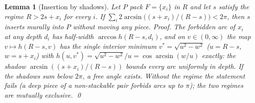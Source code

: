 \documentclass[11pt]{article}
\newtheorem{lemma}[theorem]{Lemma}
\theoremstyle{definition}
\begin{document}
\begin{lemma}[Insertion by shadows]\label{lem:insert}
Let $P$ pack $F=\{x_i\}$ in $R$ and let $s$ satisfy the regime
$R>2s+x_i$ for every $i$. If
$\sum_i2\arcsin\bigl((s+x_i)/(R-s)\bigr)<2\pi$, then $s$ inserts
murally into $P$ without moving any piece. \emph{Proof.} The
forbidden arc of $x_i$ at any depth $d_i$ has half-width
$\arccos h(R-s,d_i)$, and on $v\in(0,\infty)$ the map
$v\mapsto h(R-s,v)$ has the single interior minimum
$v^*=\sqrt{u^2-w^2}$ ($u=R-s$, $w=s+x_i$) with
$h(u,v^*)=\sqrt{u^2-w^2}/u=\cos\arcsin(w/u)$ exactly: the shadow
$\arcsin((s+x_i)/(R-s))$ bounds every arc uniformly in depth. If the
shadows sum below $2\pi$, a free angle exists. Without the regime
the statement fails (a deep piece of a non-stackable pair forbids
arcs up to $\pi$); the two regimes are mutually exclusive. \qed
\end{lemma}
\end{document}
